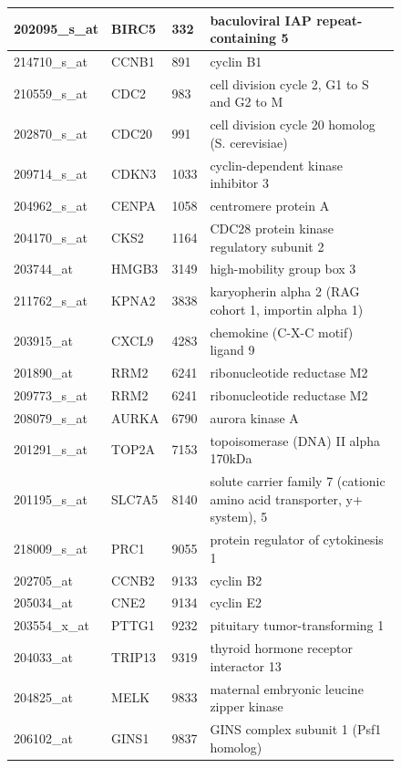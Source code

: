 \documentclass[a4paper,10pt]{article}
\begin{document}
\begin{figure}
\begin{tabular}{| l | l | l | l | }
    \hline
202095\_s\_at & BIRC5 & 332 & baculoviral IAP repeat-containing 5\\ \hline 
214710\_s\_at & CCNB1 & 891 & cyclin B1\\ \hline 
210559\_s\_at & CDC2 & 983 & cell division cycle 2, G1 to S and G2 to M\\ \hline 
202870\_s\_at & CDC20 & 991 & cell division cycle 20 homolog (S. cerevisiae)\\ \hline 
209714\_s\_at & CDKN3 & 1033 & cyclin-dependent kinase inhibitor 3\\ \hline 
204962\_s\_at & CENPA & 1058 & centromere protein A\\ \hline 
204170\_s\_at & CKS2 & 1164 & CDC28 protein kinase regulatory subunit 2\\ \hline 
203744\_at & HMGB3 & 3149 & high-mobility group box 3\\ \hline 
211762\_s\_at & KPNA2 & 3838 & karyopherin alpha 2 (RAG cohort 1, importin alpha 1)\\ \hline 
203915\_at & CXCL9 & 4283 & chemokine (C-X-C motif) ligand 9\\ \hline 
201890\_at & RRM2 & 6241 & ribonucleotide reductase M2\\ \hline 
209773\_s\_at & RRM2 & 6241 & ribonucleotide reductase M2\\ \hline 
208079\_s\_at & AURKA & 6790 & aurora kinase A\\ \hline 
201291\_s\_at & TOP2A & 7153 & topoisomerase (DNA) II alpha 170kDa\\ \hline 
201195\_s\_at & SLC7A5 & 8140 & solute carrier family 7 (cationic amino acid transporter, y+ system), 5\\ \hline 
218009\_s\_at & PRC1 & 9055 & protein regulator of cytokinesis 1\\ \hline 
202705\_at & CCNB2 & 9133 & cyclin B2\\ \hline 
205034\_at & CNE2 & 9134 & cyclin E2\\ \hline 
203554\_x\_at & PTTG1 & 9232 & pituitary tumor-transforming 1\\ \hline 
204033\_at & TRIP13 & 9319 & thyroid hormone receptor interactor 13\\ \hline 
204825\_at & MELK & 9833 & maternal embryonic leucine zipper kinase\\ \hline 
206102\_at & GINS1 & 9837 & GINS complex subunit 1 (Psf1 homolog)\\ \hline 

\end{tabular}
\end{figure}
\end{document}
